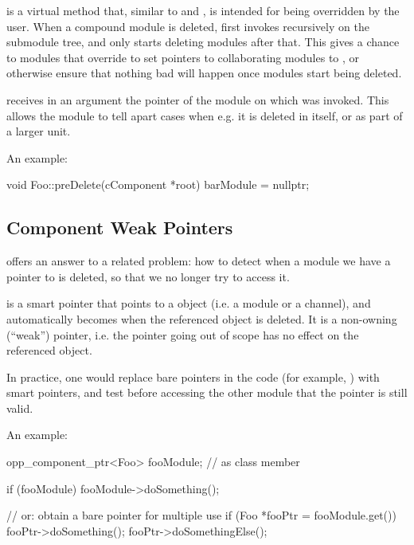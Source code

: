 \begin{ned}
 is a  virtual method that, similar to
 and , is intended for being overridden
by the user. When a compound module is deleted,  first
invokes  recursively on the submodule tree, and only starts
deleting modules after that. This gives a chance to modules that override
 to set pointers to collaborating modules to ,
or otherwise ensure that nothing bad will happen once modules start being
deleted.

 receives in an argument the pointer of the module on which
 was invoked. This allows the module to tell apart cases
when e.g. it is deleted in itself, or as part of a larger unit.

An example:

\begin{cpp}
void Foo::preDelete(cComponent *root)
{
    barModule = nullptr;
}
\end{cpp}


\subsection{Component Weak Pointers}
\label{sec:simple-modules:weak-compontent-ptr}

 offers an answer to a related problem: how to detect
when a module we have a pointer to is deleted, so that we no longer try to
access it.

 is a smart pointer that points to a
 object (i.e. a module or a channel), and automatically
becomes  when the referenced object is deleted. It is a non-owning
(``weak'') pointer, i.e. the pointer going out of scope has no effect on the
referenced object.

In practice, one would replace bare pointers in the code (for example,
) with  smart pointers, and test
before accessing the other module that the pointer is still valid.

An example:

\begin{cpp}
opp_component_ptr<Foo> fooModule;  // as class member

if (fooModule)
    fooModule->doSomething();

// or: obtain a bare pointer for multiple use
if (Foo *fooPtr = fooModule.get()) {
    fooPtr->doSomething();
    fooPtr->doSomethingElse();
}


\end{cpp}
\end{ned}
